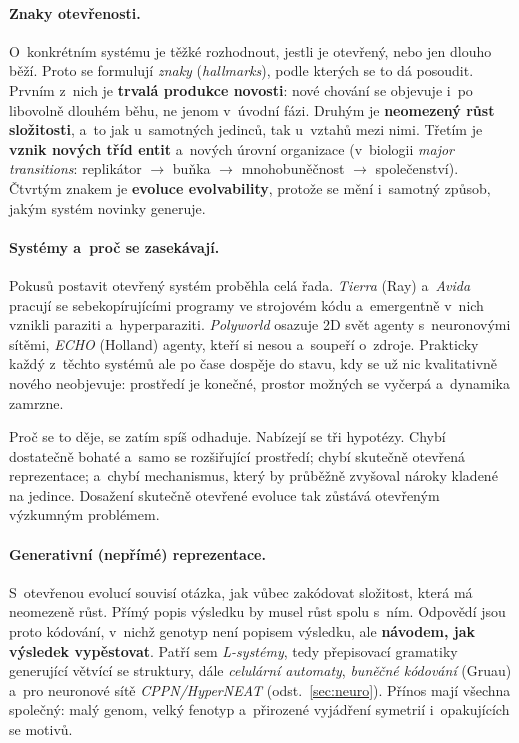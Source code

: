 \documentclass[11pt,a4paper]{article}
\theoremstyle{definition}
\begin{document}
\paragraph{Znaky otevřenosti.} O~konkrétním systému je těžké rozhodnout, jestli je otevřený,
nebo jen dlouho běží. Proto se formulují \emph{znaky} (\emph{hallmarks}), podle kterých se to
dá posoudit. Prvním z~nich je \textbf{trvalá produkce novosti}: nové chování se objevuje
i~po libovolně dlouhém běhu, ne jenom v~úvodní fázi. Druhým je \textbf{neomezený růst
složitosti}, a~to jak u~samotných jedinců, tak u~vztahů mezi nimi. Třetím je \textbf{vznik
nových tříd entit} a~nových úrovní organizace (v~biologii \emph{major transitions}:
replikátor $\to$ buňka $\to$ mnohobuněčnost $\to$ společenství). Čtvrtým znakem je
\textbf{evoluce evolvability}, protože se mění i~samotný způsob, jakým systém novinky
generuje.

\paragraph{Systémy a~proč se zasekávají.} Pokusů postavit otevřený systém proběhla celá řada.
\emph{Tierra} (Ray) a~\emph{Avida} pracují se sebekopírujícími programy ve strojovém kódu
a~emergentně v~nich vznikli paraziti a~hyperparaziti. \emph{Polyworld} osazuje 2D svět agenty
s~neuronovými sítěmi, \emph{ECHO} (Holland) agenty, kteří si nesou  a~soupeří
o~zdroje. Prakticky každý z~těchto systémů ale po čase dospěje do stavu, kdy se už nic
kvalitativně nového neobjevuje: prostředí je konečné, prostor možných  se
vyčerpá a~dynamika zamrzne.

Proč se to děje, se zatím spíš odhaduje. Nabízejí se tři hypotézy. Chybí dostatečně bohaté
a~samo se rozšiřující prostředí; chybí skutečně otevřená reprezentace; a~chybí mechanismus,
který by průběžně zvyšoval nároky kladené na jedince. Dosažení skutečně otevřené evoluce
tak zůstává otevřeným výzkumným problémem.

\paragraph{Generativní (nepřímé) reprezentace.} S~otevřenou evolucí souvisí otázka, jak vůbec
zakódovat složitost, která má neomezeně růst. Přímý popis výsledku by musel růst spolu s~ním.
Odpovědí jsou proto kódování, v~nichž genotyp není popisem výsledku, ale \textbf{návodem, jak
výsledek vypěstovat}. Patří sem \emph{L-systémy}, tedy přepisovací gramatiky generující
větvící se struktury, dále \emph{celulární automaty}, \emph{buněčné kódování} (Gruau)
a~pro neuronové sítě \emph{CPPN/HyperNEAT} (odst.~\ref{sec:neuro}). Přínos mají všechna
společný: malý genom, velký fenotyp a~přirozené vyjádření symetrií i~opakujících se motivů.
\end{document}
